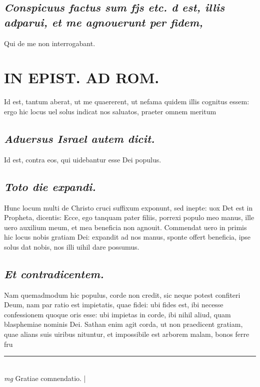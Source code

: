 \documentclass{article}
\begin{document}
\begin{pages}
\subsection*{\textit{Conspicuus factus sum fjs etc. d est, illis adparui, et me agnouerunt per fidem, }}\pstart Qui de me non interrogabant.  \pend
\section*{IN EPIST. AD ROM.  }
\marginpar{[ p.124 ]}\pstart Id est, tantum aberat, ut me quaererent, ut nefama quidem illis cognitus essem: ergo hic locus uel solus indicat nos saluatos, praeter omnem meritum\pend
{}
{}
\subsection*{\textit{Aduersus Israel autem dicit. }}\pstart Id est, contra eos, qui uidebantur esse Dei populus.   \pend
{}
{}
\subsection*{\textit{Toto die expandi. }}\pstart Hunc locum multi de Christo cruci suffixum exponunt, sed inepte: uox Det est in Propheta, dicentis: Ecce, ego tanquam pater filiis, porrexi populo meo manus, ille uero auxilium meum, et mea beneficia non agnouit. Commendat uero in primis hic locus nobis gratiam Dei: expandit ad nos manus, sponte offert beneficia, ipse solus dat nobis, nos illi uihil dare possumus.   \pend
{}
{}
\subsection*{\textit{Et contradicentem. }}\pstart Nam quemadmodum hic populus, corde non credit, sic neque potest confiteri Deum, nam par ratio est impietatis, quae fidei: ubi fides est, ibi necesse confessionem quoque oris esse: ubi impietas in corde, ibi nihil aliud, quam blasphemiae nominis Dei. Sathan enim agit corda, ut non praedicent gratiam, quae alians suis uiribus nituntur, et impossibile est arborem malam, bonos ferre fru\pend
\vspace{0.5cm}\noindent
\vspace{0.2cm}\rule{1cm}{0.2pt}\\ 
\hspace{0.2cm}\textit{mg}
\footnotesize Gratiae comnendatio.  
\normalsize| 

\end{pages}
\end{document}
